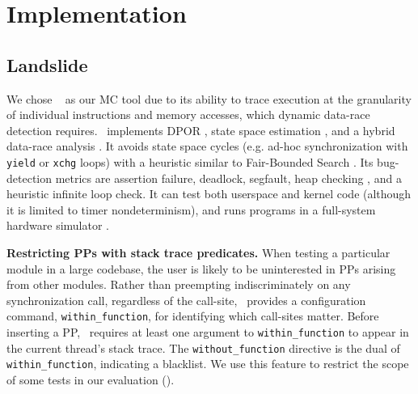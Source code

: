 \section{Implementation}
\label{sec:implementation}

\subsection{Landslide}
\label{sec:landslide}

We chose \landslide~\cite{landslide} as our MC tool due to its ability to trace execution at the granularity of individual instructions and memory accesses, which dynamic data-race detection requires.
\landslide~implements DPOR \cite{dpor},
state space estimation \cite{estimation}, and a hybrid
data-race analysis \cite{hybriddatarace}.
It avoids state space cycles (e.g. ad-hoc synchronization with {\tt yield} or {\tt xchg} loops) with a heuristic similar to Fair-Bounded Search \cite{bpor}.
Its bug-detection metrics are assertion failure, deadlock, segfault, heap checking \cite{valgrind}, and a heuristic infinite loop check.
It can test both userspace and kernel code (although it is limited to timer nondeterminism),
and runs programs in a full-system hardware simulator \cite{simics}.

{\bf Restricting PPs with stack trace predicates.}
When testing a particular module in a large codebase,
the user is likely to be uninterested in PPs arising from other modules.
Rather than preempting indiscriminately on any synchronization call, regardless of the call-site,
\landslide~provides a configuration command, {\tt within\_function}, for identifying which call-sites matter.
Before inserting a PP, \landslide~requires at least one argument to {\tt within\_function} to appear in the current thread's stack trace.
The {\tt without\_\allowbreak{}function} directive is the dual of {\tt within\_function}, indicating a blacklist.
We use this feature to restrict the scope of some tests in our evaluation (\sect{\ref{sec:testsuite}}).

